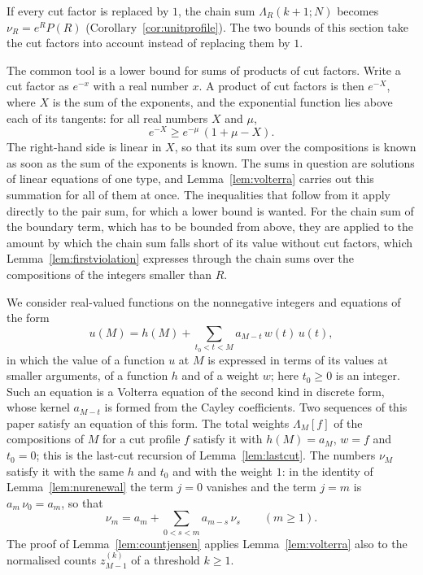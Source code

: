 \documentclass{amsart}
\theoremstyle{definition}
\theoremstyle{remark}
\numberwithin{equation}{section}
\begin{document}
If every cut factor is replaced by $1$, the chain
sum $\Lambda_R(k+1;N)$ becomes
$\nu_R=e^{R}P(R)$ (Corollary~\ref{cor:unitprofile}). The two bounds of this
section take the cut factors into account instead of replacing them by $1$.

The common tool is a lower bound for sums of products of cut factors. Write
a cut factor as $e^{-x}$ with a real number $x$. A product of cut factors is
then $e^{-X}$, where $X$ is the sum of the exponents, and the exponential
function lies above each of its tangents: for all real numbers $X$ and $\mu$,
\begin{equation}\label{eq:pair-tangent}
e^{-X}\ge e^{-\mu}\,(1+\mu-X).
\end{equation}
The right-hand side is linear in $X$, so that its sum over the compositions
is known as soon as the sum of the exponents
is known. The sums in question are solutions of linear equations of one
type, and Lemma~\ref{lem:volterra} carries out this summation for all of
them at once. The inequalities that follow from it apply directly to the
pair sum, for which a lower bound is wanted. For the chain sum of the
boundary term, which has to be bounded from above, they are applied to the
amount by which the chain sum falls short of its value without cut factors,
which Lemma~\ref{lem:firstviolation} expresses through the chain sums over
the compositions of the integers smaller than $R$.

We consider real-valued functions
on the nonnegative integers and equations of the form
\begin{equation}\label{eq:pair-volterra}
u(M)=h(M)+\sum_{t_0<t<M}a_{M-t}\,w(t)\,u(t),
\end{equation}
in which the value of a function $u$ at $M$ is expressed in terms of its
values at smaller arguments, of a function $h$ and of a weight $w$; here
$t_0\ge0$ is
an integer. Such an equation is a Volterra equation of the second kind in
discrete form, whose kernel $a_{M-t}$ is formed from the Cayley
coefficients. Two sequences of this paper satisfy an equation of
this form. The
total weights $\Lambda_M[f]$ of the compositions of $M$ for a cut profile
$f$ satisfy it with $h(M)=a_M$, $w=f$ and $t_0=0$; this is the last-cut
recursion of Lemma~\ref{lem:lastcut}. The numbers $\nu_M$ satisfy it with
the same $h$ and $t_0$ and with the weight $1$: in the identity of
Lemma~\ref{lem:nurenewal} the term $j=0$ vanishes and the term $j=m$ is
$a_m\,\nu_0=a_m$, so that
\begin{equation}\label{eq:pair-nurenewal}
\nu_m=a_m+\sum_{0<s<m}a_{m-s}\,\nu_s\qquad(m\ge1).
\end{equation}
The proof of Lemma~\ref{lem:countjensen} applies Lemma~\ref{lem:volterra}
also to the normalised counts $z^{(k)}_{M-1}$ of a threshold $k\ge1$.
\end{document}

